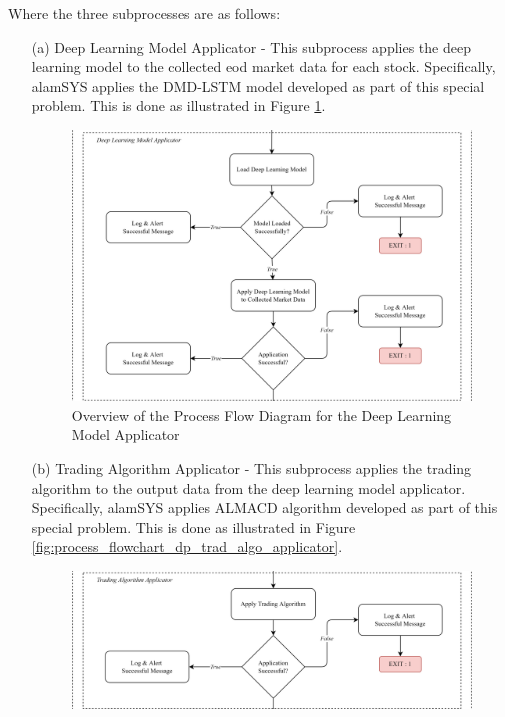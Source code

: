 Where the three subprocesses are as follows:
\begin{itemize}
    \item[(a)] Deep Learning Model Applicator - This subprocess applies the deep learning model
    to the collected eod market data for each stock. Specifically, alamSYS applies the DMD-LSTM
    model developed as part of this special problem. This is done as illustrated in Figure
    \ref{fig:process_flowchart_dp_model_applicator}.
    \begin{figure}[ht]
        \centering
        \includegraphics[width=1\textwidth]{./assets/Chapter_3/PFC/ProcessFlowchart_DataProcessor1.png}
        \caption{Overview of the Process Flow Diagram for the Deep Learning Model Applicator}
        \label{fig:process_flowchart_dp_model_applicator}
    \end{figure}
    \FloatBarrier
    \item[(b)] Trading Algorithm Applicator - This subprocess applies the trading algorithm
    to the output data from the deep learning model applicator. Specifically, alamSYS applies
    ALMACD algorithm developed as part of this special problem. This is done as illustrated in Figure
    \ref{fig:process_flowchart_dp_trad_algo_applicator}.
    \begin{figure}[ht]
        \centering
        \includegraphics[width=1\textwidth]{./assets/Chapter_3/PFC/ProcessFlowchart_DataProcessor2.png}

\end{figure}
\end{itemize}
